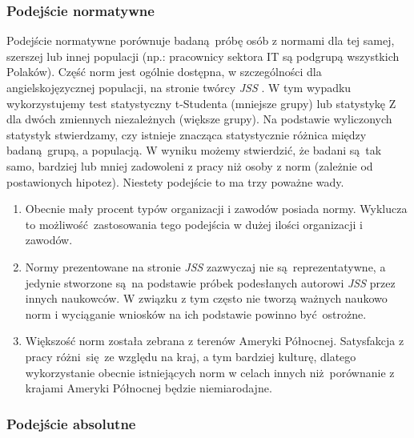 \subsubsection{Podejście normatywne}
\label{sec:jss-calc-norm}
Podejście normatywne porównuje badaną próbę osób z normami dla tej samej, szerszej lub innej populacji (np.: pracownicy sektora IT są podgrupą wszystkich Polaków). Część norm jest ogólnie dostępna, w szczególności dla angielskojęzycznej populacji, na stronie twórcy \emph{JSS} \cite{web:jss-norms}. W tym wypadku wykorzystujemy test statystyczny t-Studenta (mniejsze grupy) lub statystykę Z dla dwóch zmiennych niezależnych (większe grupy). Na podstawie wyliczonych statystyk
stwierdzamy, czy istnieje znacząca statystycznie różnica między badaną grupą, a populacją. W wyniku możemy stwierdzić, że badani są tak samo, bardziej lub mniej zadowoleni z pracy niż osoby z norm (zależnie od postawionych hipotez). Niestety podejście to
ma trzy poważne wady.
\begin{enumerate}
\item Obecnie mały procent typów organizacji i zawodów posiada normy. Wyklucza to możliwość zastosowania tego podejścia w dużej ilości organizacji i zawodów.
\item Normy prezentowane na stronie \emph{JSS} zazwyczaj nie są reprezentatywne, a jedynie stworzone są na podstawie próbek podesłanych autorowi \emph{JSS} przez innych naukowców. W związku z tym często nie tworzą ważnych naukowo norm i wyciąganie wniosków na ich podstawie powinno być ostrożne.
\item Większość norm została zebrana z terenów Ameryki Północnej. Satysfakcja z pracy różni się ze względu na kraj, a tym bardziej kulturę, dlatego wykorzystanie obecnie istniejących norm w celach innych niż porównanie z krajami Ameryki Północnej będzie niemiarodajne.
\end{enumerate}
 
\subsubsection{Podejście absolutne}
\label{sec:tests-sat-abs}

